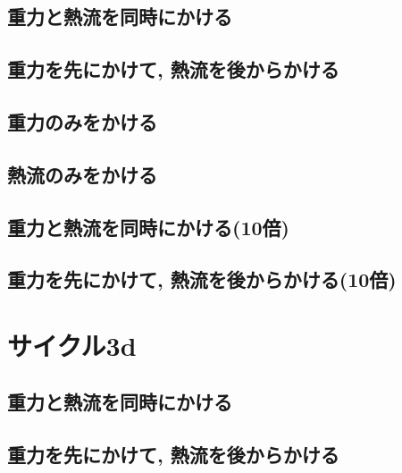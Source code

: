 \subsection{重力と熱流を同時にかける}



\subsection{重力を先にかけて, 熱流を後からかける}



\subsection{重力のみをかける}



\subsection{熱流のみをかける}



\subsection{重力と熱流を同時にかける(10倍)}



\subsection{重力を先にかけて, 熱流を後からかける(10倍)}




\section{サイクル3d}

\subsection{重力と熱流を同時にかける}



\subsection{重力を先にかけて, 熱流を後からかける}

